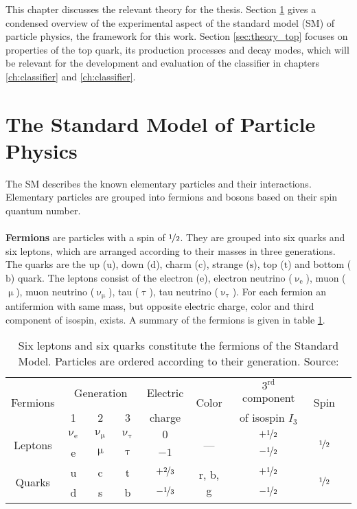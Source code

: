 This chapter discusses the relevant theory for the thesis. Section \ref{sec:theory_sm} gives a condensed overview of the experimental aspect of the standard model (SM) of particle physics, the framework for this work. Section \ref{sec:theory_top} focuses on properties of the top quark, its production processes and decay modes, which will be relevant for the development and evaluation of the classifier in chapters \ref{ch:classifier} and \ref{ch:classifier}.
\section{The Standard Model of Particle Physics}
\label{sec:theory_sm}
The SM describes the known elementary particles and their interactions. Elementary particles are grouped into fermions and bosons based on their spin quantum number.\\ \\
\textbf{Fermions} are particles with a spin of $\nicefrac{1}{2}$. They are grouped into six quarks and six leptons, which are arranged according to their masses in three generations. The quarks are the up ($\textrm{u}$), down ($\textrm{d}$), charm ($\textrm{c}$), strange ($\textrm{s}$), top ($\textrm{t}$) and bottom ($\textrm{b}$) quark. The leptons consist of the electron ($\textrm{e}$), electron neutrino ($\upnu_\textrm{e}$), muon ($\upmu$), muon neutrino ($\upnu_\upmu$), tau ($\uptau$), tau neutrino ($\upnu_\uptau$). For each fermion an antifermion with same mass, but opposite electric charge, color and third component of isospin, exists. A summary of the fermions is given in table \ref{tab:ch_1_sm_fermions}.

\begin{table}[h]
\caption[Fermions of the Standard Model]{Six leptons and six quarks constitute the fermions of the Standard Model. Particles are ordered according to their generation. Source: \cite{povh,schenkel}}
\label{tab:ch_1_sm_fermions}
\begin{tabular}{ccccccccc}
\toprule
\multirow{2}{*}{Fermions} & \multicolumn{3}{c}{Generation} & {Electric} & \multirow{2}{*}{Color} & {$3^{\mathrm{rd}}$ component} & \multirow{2}{*}{Spin}\\
& 1 & 2 & 3 & {charge} & & {of isospin $I_3$} & \\
\midrule
\multirow{2}{*}{Leptons} & $\upnu_\textrm{e}$ & $\upnu_\upmu$ & $\upnu_\uptau$ & {$0$} & \multirow{2}{*}{---} & {$+\nicefrac{1}{2}$} & \multirow{2}{*}{$\nicefrac{1}{2}$}\\
& e & $\upmu$ & $\uptau$ & {$-1$} & & {$-\nicefrac{1}{2}$} &\\
\midrule
\multirow{2}{*}{Quarks} & u & c & t & $+\nicefrac{2}{3}$ & \multirow{2}{*}{r, b, g} & {$+\nicefrac{1}{2}$} & \multirow{2}{*}{$\nicefrac{1}{2}$}\\
& d & s & b & $-\nicefrac{1}{3}$ & & {$-\nicefrac{1}{2}$} & \\
\bottomrule
\end{tabular}
\end{table}

